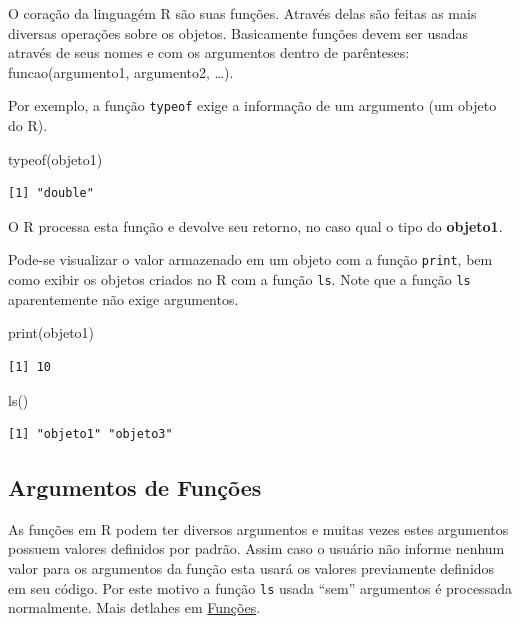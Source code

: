 \documentclass[
  letterpaper,
  DIV=11,
  numbers=noendperiod]{scrreprt}
\newenvironment{Shaded}{\begin{snugshade}}{\end{snugshade}}
\newcommand{\FunctionTok}[1]{\textcolor[rgb]{0.28,0.35,0.67}{#1}}
\newcommand{\NormalTok}[1]{\textcolor[rgb]{0.00,0.23,0.31}{#1}}
\begin{document}
O coração da linguagém R são suas funções. Através delas são feitas as
mais diversas operações sobre os objetos. Basicamente funções devem ser
usadas através de seus nomes e com os argumentos dentro de parênteses:
funcao(argumento1, argumento2, \ldots).

Por exemplo, a função \texttt{typeof} exige a informação de um argumento
(um objeto do R).

\begin{Shaded}
\begin{Highlighting}[]
\FunctionTok{typeof}\NormalTok{(objeto1)}
\end{Highlighting}
\end{Shaded}

\begin{verbatim}
[1] "double"
\end{verbatim}

O R processa esta função e devolve seu retorno, no caso qual o tipo do
\textbf{objeto1}.

Pode-se visualizar o valor armazenado em um objeto com a função
\texttt{print}, bem como exibir os objetos criados no R com a função
\texttt{ls}. Note que a função \texttt{ls} aparentemente não exige
argumentos.

\begin{Shaded}
\begin{Highlighting}[]
\FunctionTok{print}\NormalTok{(objeto1)}
\end{Highlighting}
\end{Shaded}

\begin{verbatim}
[1] 10
\end{verbatim}

\begin{Shaded}
\begin{Highlighting}[]
\FunctionTok{ls}\NormalTok{()}
\end{Highlighting}
\end{Shaded}

\begin{verbatim}
[1] "objeto1" "objeto3"
\end{verbatim}

\hypertarget{argumentos-de-funuxe7uxf5es}{%
\subsection{Argumentos de Funções}\label{argumentos-de-funuxe7uxf5es}}

As funções em R podem ter diversos argumentos e muitas vezes estes
argumentos possuem valores definidos por padrão. Assim caso o usuário
não informe nenhum valor para os argumentos da função esta usará os
valores previamente definidos em seu código. Por este motivo a função
\texttt{ls} usada ``sem'' argumentos é processada normalmente. Mais
detlahes em \href{r_funcoes.html}{Funções}.
\end{document}
